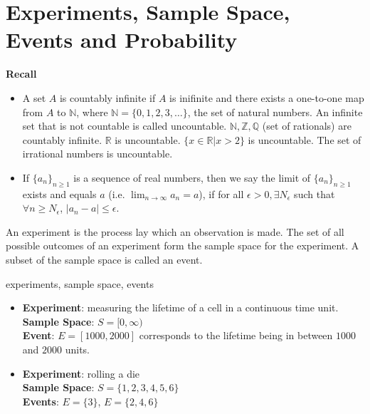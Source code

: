 \section{Experiments, Sample Space, Events and Probability}
\noindent \textbf{Recall}
\begin{itemize}[noitemsep,topsep=0pt]
    \item
    A set $A$ is countably infinite if $A$ is inifinite and there exists
a one-to-one map from $A$ to $\mathbb{N}$, where $\mathbb{N} = \lbrace 0, 1,
2, 3, \dots \rbrace$, the set of natural numbers. An infinite set that is not
countable is called uncountable. $\mathbb{N}, \mathbb{Z}, \mathbb{Q}$ (set of
rationals) are countably infinite. $\mathbb{R}$ is uncountable. $\lbrace x
\in \mathbb{R} \vert x > 2 \rbrace$ is uncountable. The set of irrational
numbers is uncountable.
    \item
    If $\lbrace a_n \rbrace_{n \geq 1}$ is a sequence of real numbers, then we
say the limit of $\lbrace a_n \rbrace_{n \geq 1}$ exists and equals $a$ (i.e. $
\lim_{n \rightarrow \infty} a_n = a$), if for all $\epsilon > 0, \exists
N_\epsilon$ such that $\forall n \geq N_\epsilon$, $\vert a_n - a \vert
\leq \epsilon$.
\end{itemize}

\begin{definition}
    An experiment is the process lay which an observation is made. The set of
all possible outcomes of an experiment form the sample space for the
experiment. A subset of the sample space is called an event.
\end{definition}

\begin{example}
experiments, sample space, events
\begin{itemize}[noitemsep,topsep=0pt]
    \item
    \textbf{Experiment}:
        measuring the lifetime of a cell in a continuous time unit.          \\
    \textbf{Sample Space}: $S = [0, \infty)$                                 \\
    \textbf{Event}:
        $E = [1000, 2000]$ corresponds to the lifetime being in between $1000$
        and $2000$ units.                                                    \\
    \item
    \textbf{Experiment}:
        rolling a die                                                        \\
    \textbf{Sample Space}: $S = \lbrace 1, 2, 3, 4, 5, 6 \rbrace$            \\
    \textbf{Events}: $E = \lbrace 3 \rbrace$, $E = \lbrace 2, 4, 6 \rbrace$
\end{itemize}
\end{example}

